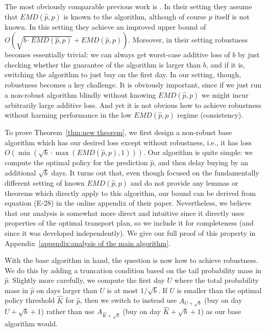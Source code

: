 The most obviously comparable previous work is \citet{besbes}.  In their setting they assume that $EMD(\hat p, p)$ is known to the algorithm, although of course $p$ itself is not known.  In this setting they achieve an improved upper bound of $O\left(\sqrt{b \cdot EMD(\hat p, p)} + EMD(\hat p, p)\right)$.  Moreover, in their setting robustness becomes essentially trivial: we can always get worst-case additive loss of $b$ by just checking whether the guarantee of the algorithm is larger than $b$, and if it is, switching the algorithm to just buy on the first day.  In our setting, though, robustness becomes a key challenge.  It is obviously important, since if we just run a non-robust algorithm blindly without knowing $EMD(\hat p, p)$ we might incur arbitrarily large additive loss.  And yet it is not obvious how to achieve robustness without harming performance in the low $EMD(\hat p, p)$ regime (consistency).

To prove Theorem~\ref{thm:new theorem}, we first design a non-robust base algorithm which has our desired loss except without robustness, i.e., it has loss $O\left( \min\left( \sqrt{b} \cdot \max\left(EMD(\hat p, p), 1\right)\right)\right)$.  Our algorithm is quite simple: we compute the optimal policy for the prediction $\hat p$, and then delay buying by an additional $\sqrt{b}$ days.  It turns out that, even though \citet{besbes} focused on the fundamentally different setting of known $EMD(\hat p, p)$ and do not provide any lemmas or theorems which directly apply to this algorithm, our bound can be derived from equation (E-28) in the online appendix of their paper.  Nevertheless, we believe that our analysis is somewhat more direct and intuitive since it directly uses properties of the optimal transport plan, so we include it for completeness (and since it was developed independently).  We give our full proof of this property in Appendix~\ref{appendix:analysis of the main algorithm}.

With the base algorithm in hand, the question is now how to achieve robustness.  We do this by adding a truncation condition based on the tail probability mass in $\hat p$.  Slightly more carefully, we compute the first day $U$ where the total probability mass in $\hat p$ on days larger than $U$ is at most $1/\sqrt{b}$.  If $U$ is smaller than the optimal policy threshold $\hat K$ for $\hat p$, then we switch to instead use $A_{U + \sqrt{b}}$ (buy on day $U + \sqrt{b}+1$) rather than use $A_{\hat K + \sqrt{b}}$ (buy on day $\hat K + \sqrt{b}+1$) as our base algorithm would.  

